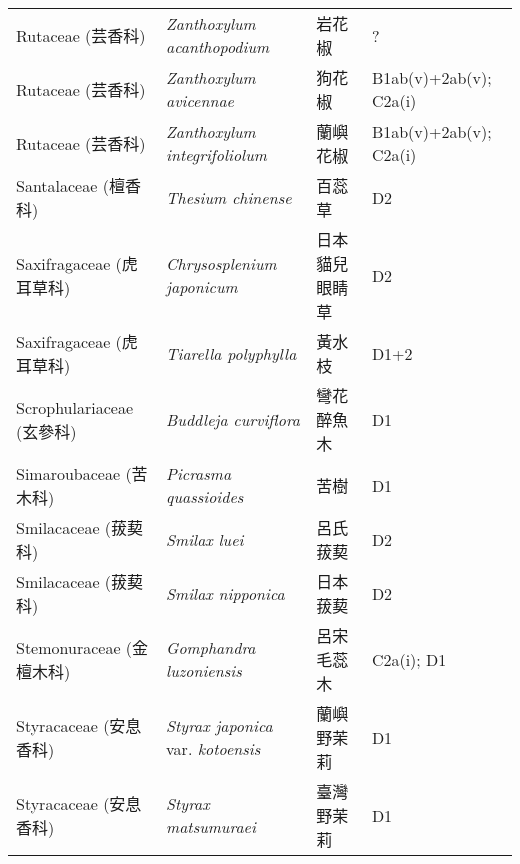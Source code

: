 \begin{longtable}{p{3cm}p{5cm}p{3cm}p{4cm}}
    Rutaceae (芸香科) & \textit{Zanthoxylum acanthopodium}  & 岩花椒 & ? \index{Zanthoxylum@\textit{Zanthoxylum}!acanthopodium@\textit{acanthopodium}}  \index{岩花椒} \\
    Rutaceae (芸香科) & \textit{Zanthoxylum avicennae}  & 狗花椒 & B1ab(v)+2ab(v); C2a(i) \index{Zanthoxylum@\textit{Zanthoxylum}!avicennae@\textit{avicennae}}  \index{狗花椒} \\
    Rutaceae (芸香科) & \textit{Zanthoxylum integrifoliolum}  & 蘭嶼花椒 & B1ab(v)+2ab(v); C2a(i) \index{Zanthoxylum@\textit{Zanthoxylum}!integrifoliolum@\textit{integrifoliolum}}  \index{蘭嶼花椒} \\
    Santalaceae (檀香科) & \textit{Thesium chinense}  & 百蕊草 & D2 \index{Thesium@\textit{Thesium}!chinense@\textit{chinense}}  \index{百蕊草} \\
    Saxifragaceae (虎耳草科) & \textit{Chrysosplenium japonicum}  & 日本貓兒眼睛草 & D2 \index{Chrysosplenium@\textit{Chrysosplenium}!japonicum@\textit{japonicum}}  \index{日本貓兒眼睛草} \\
    Saxifragaceae (虎耳草科) & \textit{Tiarella polyphylla}  & 黃水枝 & D1+2 \index{Tiarella@\textit{Tiarella}!polyphylla@\textit{polyphylla}}  \index{黃水枝} \\
    Scrophulariaceae (玄參科) & \textit{Buddleja curviflora}  & 彎花醉魚木 & D1 \index{Buddleja@\textit{Buddleja}!curviflora@\textit{curviflora}}  \index{彎花醉魚木} \\
    Simaroubaceae (苦木科) & \textit{Picrasma quassioides}  & 苦樹 & D1 \index{Picrasma@\textit{Picrasma}!quassioides@\textit{quassioides}}  \index{苦樹} \\
    Smilacaceae (菝葜科) & \textit{Smilax luei}  & 呂氏菝葜 & D2 \index{Smilax@\textit{Smilax}!luei@\textit{luei}}  \index{呂氏菝葜} \\
    Smilacaceae (菝葜科) & \textit{Smilax nipponica}  & 日本菝葜 & D2 \index{Smilax@\textit{Smilax}!nipponica@\textit{nipponica}}  \index{日本菝葜} \\
    Stemonuraceae (金檀木科) & \textit{Gomphandra luzoniensis}  & 呂宋毛蕊木 & C2a(i); D1 \index{Gomphandra@\textit{Gomphandra}!luzoniensis@\textit{luzoniensis}}  \index{呂宋毛蕊木} \\
    Styracaceae (安息香科) & \textit{Styrax japonica} var. \textit{kotoensis}  & 蘭嶼野茉莉 & D1 \index{Styrax@\textit{Styrax}!japonica@\textit{japonica}!var. kotoensis@var. \textit{kotoensis}}  \index{蘭嶼野茉莉} \\
    Styracaceae (安息香科) & \textit{Styrax matsumuraei}  & 臺灣野茉莉 & D1 \index{Styrax@\textit{Styrax}!matsumuraei@\textit{matsumuraei}}  \index{臺灣野茉莉} \\

\end{longtable}
